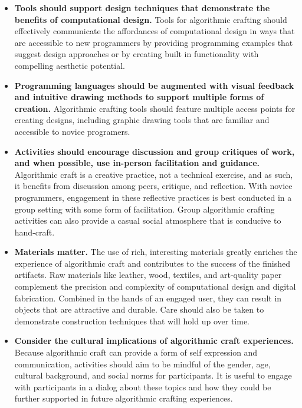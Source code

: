 \documentclass{sigchi}
\begin{document}
\begin{itemize}
\item \textbf{Tools should support design techniques that demonstrate the benefits of computational design.} Tools for algorithmic crafting should effectively communicate the affordances of computational design in ways that are accessible to new programmers by providing programming examples that suggest design approaches or by creating built in functionality with compelling aesthetic potential.

\item \textbf{Programming languages should be augmented with visual feedback and intuitive drawing methods to support multiple forms of creation.} Algorithmic crafting tools should feature multiple access points for creating designs, including graphic drawing tools that are familiar and accessible to novice programers.

\item \textbf{Activities should encourage discussion and group critiques of work, and when possible, use in-person facilitation and guidance.} Algorithmic craft is a creative practice, not a technical exercise, and as such, it benefits from discussion among peers, critique, and reflection. With novice programmers, engagement in these reflective practices is best conducted in a group setting with some form of facilitation. Group algorithmic crafting activities can also provide a casual social atmosphere that is conducive to hand-craft.


\item \textbf{Materials matter.} The use of rich, interesting materials greatly enriches the experience of algorithmic craft and contributes to the success of the finished artifacts. Raw materials like leather, wood, textiles, and art-quality paper complement the precision and complexity of computational design and digital fabrication. Combined in the hands of an engaged user, they can result in objects that are attractive and durable. Care should also be taken to demonstrate construction techniques that will hold up over time.

\item \textbf{Consider the cultural implications of algorithmic craft experiences.} Because algorithmic craft can provide a form of self expression and communication, activities should aim to be mindful of the gender, age, cultural background, and social norms for participants. It is useful to engage with participants in a dialog about these topics and how they could be further supported in future algorithmic crafting experiences.
\end{itemize}


\balance




\end{document}
